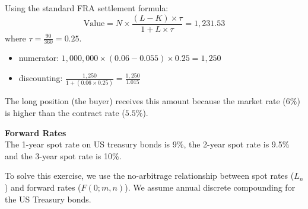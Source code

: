\documentclass[12pt,a4paper]{exam}
\begin{document}
\begin{questions}
\begin{solution}
Using the standard FRA settlement formula:
\begin{equation*}
	\text{Value} = N \times \frac{(L - K) \times \tau}{1 + L \times \tau} = 1,231.53
\end{equation*}
where $\tau = \frac{90}{360} = 0.25$.
\begin{itemize}
	\item numerator: $1,000,000 \times (0.06 - 0.055) \times 0.25 = 1,250$
	\item discounting: $\frac{1,250}{1 + (0.06 \times 0.25)} = \frac{1,250}{1.015}$
\end{itemize}
The long position (the buyer) receives this amount because the market rate ($6\%$) is higher than the contract rate ($5.5\%$).
\end{solution}

\question \textbf{Forward Rates} \\
The 1-year spot rate on US treasury bonds is 9\%, the 2-year spot rate is 9.5\% and the 3-year spot rate is 10\%.

\begin{solution}
To solve this exercise, we use the no-arbitrage relationship between spot rates ($L_n$) and forward rates ($F(0;m,n)$). We assume annual discrete compounding for the US Treasury bonds.
\end{solution}
\end{questions}
\end{document}
